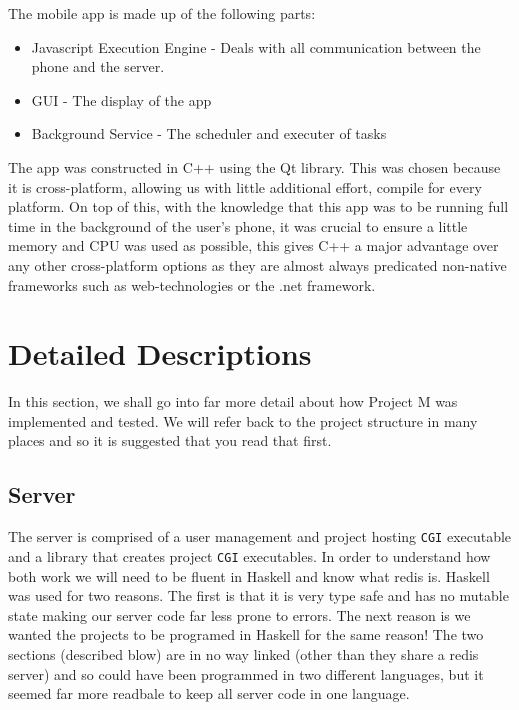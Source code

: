 \documentclass{article}
\begin{document}
The mobile app is made up of the following parts:
\begin{itemize}
  \item{Javascript Execution Engine - Deals with all communication between the phone and the server.}
  \item{GUI - The display of the app}
  \item{Background Service - The scheduler and executer of tasks}
\end{itemize}
The app was constructed in C++ using the Qt library. This was chosen because it is cross-platform, allowing us with little additional effort, compile for
every platform. On top of this, with the knowledge that this app was to be running full time in the background of the user's phone, it was crucial to
ensure a little memory and CPU was used as possible, this gives C++ a major advantage over any other cross-platform options as they are almost always
predicated non-native frameworks such as web-technologies or the .net framework.
\section{Detailed Descriptions}
In this section, we shall go into far more detail about how Project M was implemented and tested. We will refer back to the project structure in
many places and so it is suggested that you read that first.
\subsection{Server}
The server is comprised of a user management and project hosting \texttt{CGI} executable and a library that creates project \texttt{CGI} executables.
In order to understand how both work we will need to be fluent in Haskell and know what redis is. Haskell was used for two reasons. The first is that
it is very type safe and has no mutable state making our server code far less prone to errors. The next reason is we wanted the projects to be
programed in Haskell for the same reason! The two sections (described blow) are in no way linked (other than they share a redis server) and so
could have been programmed in two different languages, but it seemed far more readbale to keep all server code in one language.
\end{document}
